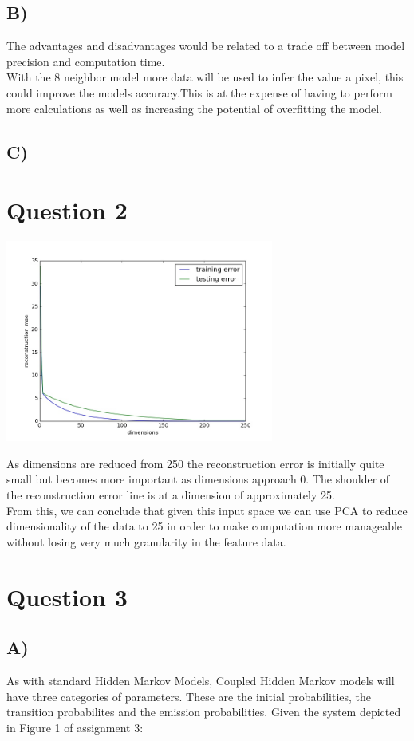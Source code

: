 \documentclass{report}
\begin{document}
\subsection*{B)}
The advantages and disadvantages would be related to a trade off between
model precision and computation time.\\

With the 8 neighbor model more data will be used to infer the value a pixel, this
could improve the models accuracy.This is at the expense of having to perform
more calculations as well as increasing the potential of overfitting the model.
\subsection*{C)}

\section*{Question 2}
\begin{center}
\includegraphics[width=250pt, keepaspectratio=true]{reconstruction_error.jpg}\\
\end{center}
As dimensions are reduced from 250 the reconstruction error is initially quite
small but becomes more important as dimensions approach 0. The
shoulder of the reconstruction error line is at a dimension of approximately 25.\\

From this, we can conclude that given this input space we can use PCA to
reduce dimensionality of the data to 25 in order to make computation more manageable
without losing very much granularity in the feature data.
\section*{Question 3}
\subsection*{A)}
As with standard Hidden Markov Models, Coupled Hidden Markov models will
have three categories of parameters. These are the initial probabilities, the
transition probabilites and the emission probabilities. Given the system
depicted in Figure 1 of assignment 3:\\
\end{document}
